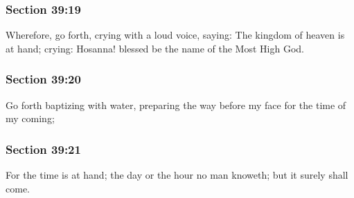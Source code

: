 	\subsubsection{Section 39:19} %
		\label{DC39-19}

		Wherefore, go forth, crying with a loud voice, saying: The kingdom of heaven is at hand; crying: Hosanna!  blessed be the name of the Most High God.


	\subsubsection{Section 39:20} %
		\label{DC39-20}

		Go forth baptizing with water, preparing the way before my face for the time of my coming;


	\subsubsection{Section 39:21} %
		\label{DC39-21}

		For the time is at hand; the day or the hour no man knoweth; but it surely shall come.


